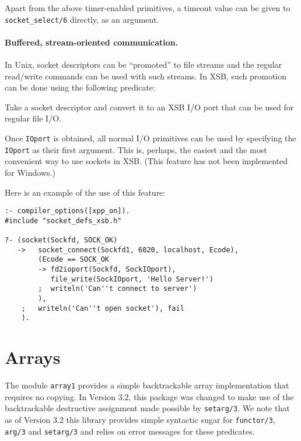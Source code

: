 \noindent
Apart from the above timer-enabled primitives, a timeout value can be given
to {\tt socket\_select/6} directly, as an argument.


\paragraph{Buffered, stream-oriented communication.}
In Unix, socket descriptors can be ``promoted'' to file streams and the
regular read/write commands can be used with such streams. In XSB, such
promotion can be done using the following predicate:
\begin{description}
    Take a socket descriptor and convert it to an XSB I/O port that can be used
    for regular file I/O. 
\end{description}
Once {\tt IOport} is obtained, all normal I/O primitives can be used by
specifying the {\tt IOport} as their first argument. This is, perhaps, the
easiest and the most convenient way to use sockets in XSB. (This feature
has not been implemented for Windows.)

\noindent
Here is an example of the use of this feature:
\begin{samepage}
\begin{verbatim}
:- compiler_options([xpp_on]).
#include "socket_defs_xsb.h"

?- (socket(Sockfd, SOCK_OK)
   ->   socket_connect(Sockfd1, 6020, localhost, Ecode),
        (Ecode == SOCK_OK
        -> fd2ioport(Sockfd, SockIOport),
           file_write(SockIOport, 'Hello Server!')
        ;  writeln('Can''t connect to server')
        ),
    ;   writeln('Can''t open socket'), fail
    ).
\end{verbatim}
\end{samepage}


\section{Arrays}

The module {\tt array1} provides a simple backtrackable array
implementation that requires no copying.  In Version 3.2, this package
was changed to make use of the backtrackable destructive assignment
made possible by {\tt setarg/3}.  We note that as of Version 3.2 this
library provides simple syntactic sugar for {\tt functor/3}, {\tt
  arg/3} and {\tt setarg/3} and relies on error messages for these
predicates.

